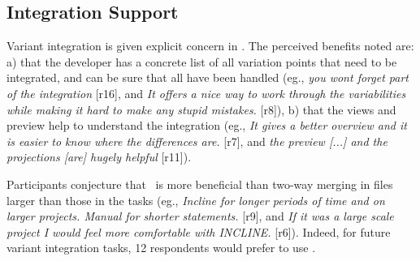 
\subsection{Integration Support}
Variant integration is given explicit concern in \tooln. The perceived benefits noted are: a) that the developer has a concrete list of all variation points that need to be integrated, and can be sure that all have been handled (eg., \textit{\bc you wont forget part of the integration\ec} [r16], and \textit{\bc It offers a nice way to work through the variabilities while making it hard to make any stupid mistakes.\ec} [r8]), b) that the views and preview help to understand the integration (eg., \textit{\bc It gives a better overview and it is easier to know where the differences are.\ec} [r7], and \textit{\bc the preview [...] and the projections [are] hugely helpful\ec} [r11]).

Participants conjecture that \tooln~is more beneficial than two-way merging in files larger than those in the tasks (eg., \textit{\bc Incline for longer periods of time and on larger projects. Manual for shorter statements.\ec} [r9], and \textit{\bc If it was a large scale project I would feel more comfortable with INCLINE.\ec} [r6]). Indeed, for future variant integration tasks, 12 respondents would prefer to use \tooln.



